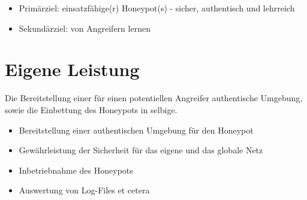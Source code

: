 \begin{itemize}
\item Primärziel: einsatzfähige(r) Honeypot(s) - sicher, authentisch und lehrreich
\item Sekundärziel: von Angreifern lernen
\end{itemize}

\section{Eigene Leistung}
\label{subsec:Eigene Leistung}

Die Bereitstellung einer für einen potentiellen Angreifer authentische Umgebung, sowie die Einbettung des Honeypots in selbige.

\begin{itemize}
\item Bereitstellung einer authentischen Umgebung für den Honeypot
\item Gewährleistung der Sicherheit für das eigene und das globale Netz
\item Inbetriebnahme des Honeypots
\item Auswertung von Log-Files et cetera
\end{itemize}


